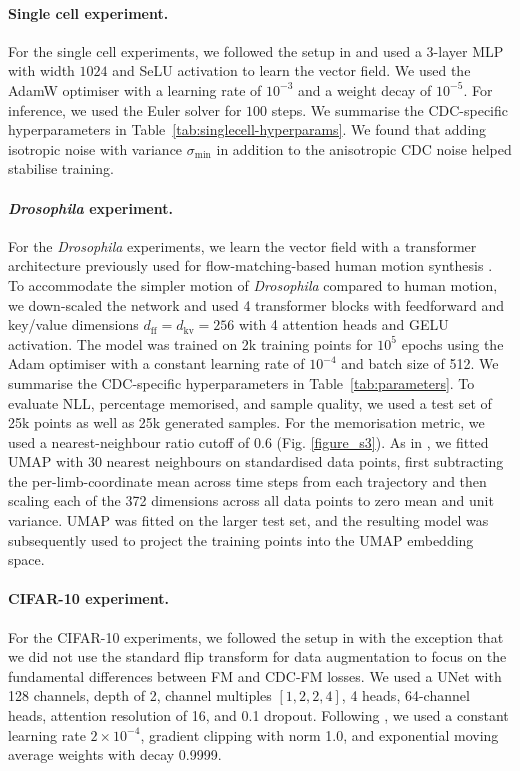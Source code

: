 \documentclass{article} %
\begin{document}
\paragraph{Single cell experiment.} For the single cell experiments, we followed the setup in \cite{kapusniak2024metric} and used a $3$-layer MLP with width $1024$ and SeLU activation to learn the vector field. We used the AdamW optimiser with a learning rate of $10^{-3}$ and a weight decay of $10^{-5}$. For inference, we used the Euler solver for $100$ steps. We summarise the CDC-specific hyperparameters in Table~\ref{tab:singlecell-hyperparams}. We found that adding isotropic noise with variance $\sigma_{\min}$ in addition to the anisotropic CDC noise helped stabilise training.

\paragraph{\textit{Drosophila} experiment.} For the \textit{Drosophila} experiments, we learn the vector field with a transformer architecture previously used for flow-matching-based human motion synthesis \citep{hu2023motionflowmatchinghuman}.
To accommodate the simpler motion of \textit{Drosophila} compared to human motion, we down-scaled the network and used 4 transformer blocks with feedforward and key/value dimensions $d_\mathrm{ff}\! =\! d_\mathrm{kv}\! =\! 256$ with 4 attention heads and GELU activation. 
The model was trained on 2k training points for $10^5$ epochs using the Adam optimiser with a constant learning rate of $10^{-4}$ and batch size of 512. 
We summarise the CDC-specific hyperparameters in Table~\ref{tab:parameters}.
To evaluate NLL, percentage memorised, and sample quality, we used a test set of  25k points as well as 25k generated samples.
For the memorisation metric, we used a nearest-neighbour ratio cutoff of 0.6 (Fig. \ref{figure_s3}). 
As in \cite{deangelis}, we fitted UMAP with 30 nearest neighbours on standardised data points, first subtracting the per-limb-coordinate mean across time steps from each trajectory and then scaling each of the 372 dimensions across all data points to zero mean and unit variance.
UMAP was fitted on the larger test set, and the resulting model was subsequently used to project the training points into the UMAP embedding space.


\paragraph{CIFAR-10 experiment.} For the CIFAR-10 experiments, we followed the setup in \citet{tong_improving_2024} with the exception that we did not use the standard flip transform for data augmentation to focus on the fundamental differences between FM and CDC-FM losses. We used a UNet \citep{dhariwal2021diffusion} with 128 channels, depth of 2, channel multiples $[1, 2, 2, 4]$, 4 heads, 64-channel heads, attention resolution of 16, and 0.1 dropout. Following \cite{tong_improving_2024}, we used a constant learning rate $2\times 10^{-4}$, gradient clipping with norm 1.0, and exponential moving average weights with decay 0.9999.
\end{document}
